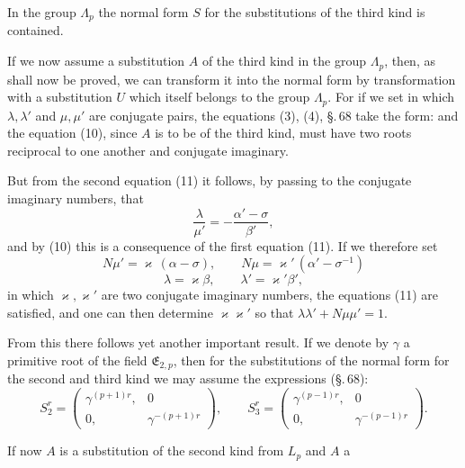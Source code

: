 In the group $\Lambda_p$ the normal form $S$ for the substitutions
of the third kind is contained.

If we now assume a substitution $A$ of the third kind in
the group $\Lambda_p$, then, as shall now be proved, we can transform
it into the normal form by transformation with a substitution
$U$ which itself belongs to the group $\Lambda_p$. For if we set
in which $\lambda,\lambda'$ and $\mu,\mu'$ are conjugate pairs, the
equations (3), (4), §.\,68 take the form:
and the equation (10), since $A$ is to be of the third kind,
must have two roots reciprocal to one another and conjugate
imaginary.

But from the second equation (11) it follows, by passing
to the conjugate imaginary numbers, that
\[
\dfrac{\lambda}{\mu'} = -\dfrac{\alpha'-\sigma}{\beta'},
\]
and by (10) this is a consequence of the first equation (11).
If we therefore set
\[
N\mu' = \varkappa\,(\alpha-\sigma), \qquad N\mu = \varkappa'\,(\alpha'-\sigma^{-1})
\]
\[
\lambda = \varkappa\beta, \qquad \lambda' = \varkappa'\beta',
\]
in which $\varkappa,\varkappa'$ are two conjugate imaginary numbers, the
equations (11) are satisfied, and one can then determine $\varkappa\varkappa'$
so that $\lambda\lambda'+N\mu\mu' = 1$.

From this there follows yet another important result. If we
denote by $\gamma$ a primitive root of the field $\mathfrak{E}_{2,p}$, then for
the substitutions of the normal form for the second and
third kind we may assume the expressions (§.\,68):
\[
S_2^r = \begin{pmatrix} \gamma^{(p+1)r}, & 0 \\ 0, & \gamma^{-(p+1)r} \end{pmatrix}, \qquad S_3^r = \begin{pmatrix} \gamma^{(p-1)r}, & 0 \\ 0, & \gamma^{-(p-1)r} \end{pmatrix}.
\]

If now $A$ is a substitution of the second kind from $L_p$ and $A$ a
